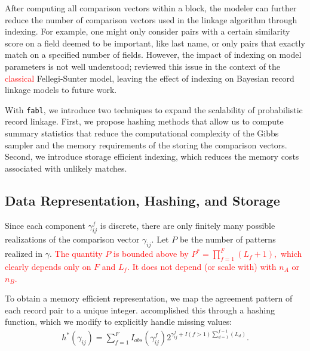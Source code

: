 \documentclass[ba]{imsart}
\begin{document}
After computing all comparison vectors within a block, the modeler can further reduce the number of comparison vectors used in the linkage algorithm through indexing. For example, one might only consider pairs with a certain similarity score on a field deemed to be important, like last name, or only pairs that exactly match on a specified number of fields. However, the impact of indexing on model parameters is not well understood; \cite{murray2016probabilistic} reviewed this issue in the context of the \textcolor{red}{classical} Fellegi-Sunter model, leaving the effect of indexing on Bayesian record linkage models to future work.

With \texttt{fabl}, we introduce two techniques to expand the scalability of probabilistic record linkage. First, we propose hashing methods that allow us to compute summary statistics that reduce the computational complexity of the Gibbs sampler and the memory requirements of the storing the comparison vectors. Second, we introduce storage efficient indexing, which reduces the memory costs associated with unlikely matches. 


\hypertarget{data-representation-hashing-and-storage}{%
	\subsection{Data Representation, Hashing, and
		Storage}\label{data-representation-hashing-and-storage}}
	
Since each component $\gamma_{ij}^f$ is discrete, there are only finitely many possible realizations of the comparison vector $\gamma_{ij}$. Let $P$ be the number of patterns realized in $\gamma$. 
\textcolor{red}{The quantity $P$ is
 bounded above by $P^{*} =  \prod_{f=1}^F (L_f + 1),$ which clearly depends only on $F$ and $L_f.$ It does not depend (or scale with) with $n_A$ or $n_B.$}


To obtain a memory efficient representation, we map the agreement pattern of each record pair to a unique integer. \cite{enamorado2019using} accomplished this through a hashing function, which we modify to explicitly handle missing values:
\begin{align}
	\label{eqn:hashing}
	h^{*}(\gamma_{ij}) = \sum_{f = 1}^F I_{obs}(\gamma_{ij}^f)2^{\gamma_{ij}^f + I(f>1)\sum_{d=1}^{f-1}(L_d)}.
\end{align}
\end{document}
